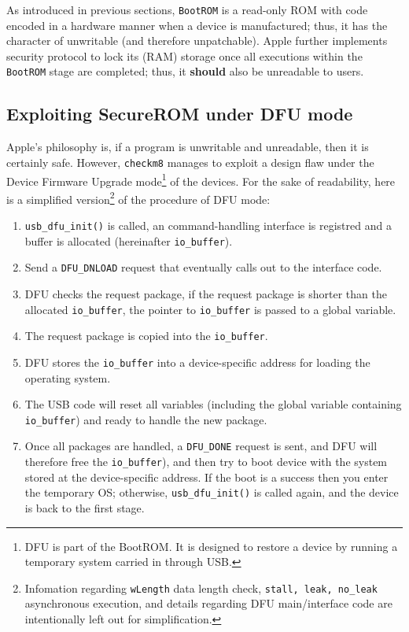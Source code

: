 \documentclass[10pt]{article}
\newcommand{\inlinecode}{\texttt}
\begin{document}
As introduced in previous sections, \inlinecode{BootROM} is a read-only ROM with code encoded in a hardware manner when a device is manufactured; thus, it has the character of unwritable (and therefore unpatchable). Apple further implements security protocol to lock its (RAM) storage once all executions within the \inlinecode{BootROM} stage are completed; thus, it \textbf{should} also be unreadable to users.

\subsection{Exploiting SecureROM under DFU mode}

Apple's philosophy is, if a program is unwritable and unreadable, then it is certainly safe. However, \inlinecode{checkm8} manages to exploit a design flaw under the Device Firmware Upgrade mode\footnote{DFU is part of the BootROM. It is designed to restore a device by running a temporary system carried in through USB.} of the devices. For the sake of readability, here is a simplified version\footnote{Infomation regarding \inlinecode{wLength} data length check, \inlinecode{stall, leak, no\_leak} asynchronous execution, and details regarding DFU main/interface code are intentionally left out for simplification.} of the procedure of DFU mode:

\begin{enumerate}
    \item \inlinecode{usb\_dfu\_init()} is called, an command-handling interface is registred and a buffer is allocated (hereinafter \inlinecode{io\_buffer}).
    \item Send a \inlinecode{DFU\_DNLOAD} request that eventually calls out to the interface code.
    \item DFU checks the request package, if the request package is shorter than the allocated \inlinecode{io\_buffer}, the pointer to \inlinecode{io\_buffer} is passed to a global variable.
    \item The request package is copied into the \inlinecode{io\_buffer}.
    \item DFU stores the \inlinecode{io\_buffer} into a device-specific address for loading the operating system.
    \item The USB code will reset all variables (including the global variable containing \inlinecode{io\_buffer}) and ready to handle the new package.
    \item Once all packages are handled, a \inlinecode{DFU\_DONE} request is sent, and DFU will therefore free the \inlinecode{io\_buffer}), and then try to boot device with the system stored at the device-specific address. If the boot is a success then you enter the temporary OS; otherwise, \inlinecode{usb\_dfu\_init()} is called again, and the device is back to the first stage.
\end{enumerate}
\end{document}
